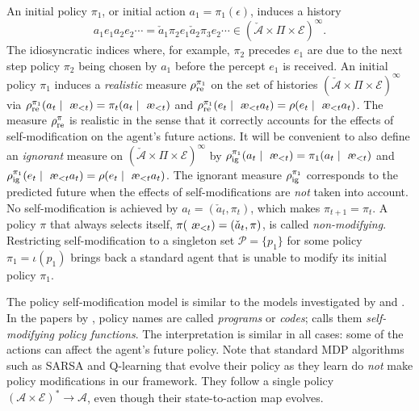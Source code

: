 \documentclass[a4paper]{article}
\theoremstyle{definition}
\theoremstyle{remark}
\def\A{\mathcal{A}}      %
\def\E{\mathcal{E}}      %
\def\H{(\A \times \E)^*} %
\let\aechar\ae %
\renewcommand{\ae}{
\ifmmode\mathchoice{
	\mbox{\textsl{\aechar}}
}{
	\mbox{\textsl{\aechar}}
}{
	\mbox{\scriptsize\textsl{\aechar}}
}{
	\mbox{\scriptsize\textsl{\aechar}}
}\else\aechar\fi%
}                         %
\newcommand*{\rhoig}[1][]{\rho_{{\rm ig} #1}}
\newcommand*{\rhore}[1][]{\rho_{{\rm re} #1}}
\newcommand*{\Po}{{\mathcal P}}
\renewcommand{\hat}{\check}
\begin{document}
An initial policy $\pi_1$, or initial action $a_1=\pi_1(\epsilon)$,
induces a history
\begin{equation*}
  a_1e_1a_2e_2\cdots=\hat a_1\pi_2 e_1 \hat{a}_2\pi_3 e_2 \cdots \in
  \left(\hat{\A}\times \Pi  \times \E\right)^\infty.
\end{equation*}
The idiosyncratic indices where, for example, $\pi_2$ precedes $e_1$
are due to the next step policy $\pi_2$ being chosen by $a_1$
before the percept $e_1$ is received.
An initial policy $\pi_1$ induces a \emph{realistic} measure $\rhore^{\pi_1}$
on the set of histories $(\hat{\A}\times\Pi\times\E)^\infty$
via $\rhore^{\pi_1}(a_t\mid\ae_{<t})=\pi_t(a_t\mid\ae_{<t})$ and
$\rhore^{\pi_1}(e_t\mid\ae_{<t}a_t)=\rho(e_t\mid\ae_{<t}a_t)$.
The measure $\rhore^{\pi}$ is realistic in the sense that it
correctly accounts for the effects of self-modification on the
agent's future actions.
It will be convenient to also define an \emph{ignorant} measure
on $(\hat{\A}\times\Pi\times\E)^\infty$ by
$\rhoig^{\pi_1}(a_t\mid\ae_{<t})=\pi_1(a_t\mid\ae_{<t})$ and
$\rhoig^{\pi_1}(e_t\mid\ae_{<t}a_t)=\rho(e_t\mid\ae_{<t}a_t)$.
The ignorant measure $\rhoig^{\pi_1}$ corresponds to the predicted future
when the effects of self-modifications are \emph{not} taken into account.
No self-modification is achieved by $a_t=(\hat a_t,\pi_t)$, which
makes $\pi_{t+1}=\pi_{t}$.
A policy $\pi$ that always selects itself, $\pi(\ae_{<t})=(\hat a_t,\pi)$, is called \emph{non-modifying}.
Restricting self-modification to a singleton set $\Po=\{p_1\}$
for some policy $\pi_1=\iota(p_1)$ brings back a standard agent that is unable to
modify its initial policy $\pi_1$.

The policy self-modification model is similar to the models
investigated by \citet{Orseau2011,Orseau2012} and \citet{Hibbard2012}.
In the papers by \citeauthor{Orseau2011}, policy names are
called \emph{programs} or \emph{codes};
\citeauthor{Hibbard2012} calls them
\emph{self-modifying policy functions}.
The interpretation is similar in all cases:
some of the actions can
affect the agent's future policy.
Note that standard MDP algorithms such as SARSA and Q-learning
that evolve their policy as they learn do \emph{not}
make policy modifications in our framework.
They follow a single policy $\H\to\A$,
even though their state-to-action map evolves.
\end{document}
